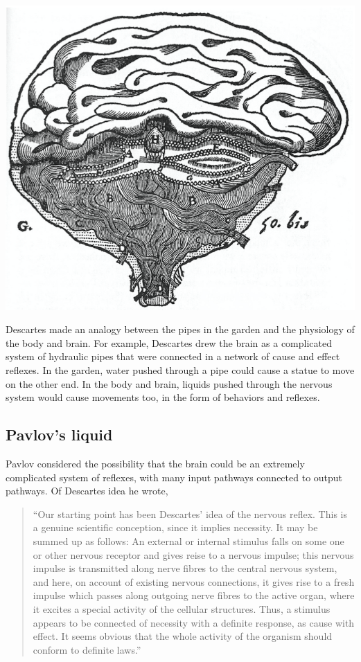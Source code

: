 \documentclass[
  oneside,
  12pt]{crumpbook}
\newenvironment{floatright50}{%
  \wrapfigure{R}{.5\textwidth}%
  }{%
  \endwrapfigure}
\begin{document}
\begin{floatright50}
\includegraphics[width=1\linewidth]{imgs/Descartes_brain_large}

\end{floatright50}

Descartes made an analogy between the pipes in the garden and the physiology of the body and brain. For example, Descartes drew the brain as a complicated system of hydraulic pipes that were connected in a network of cause and effect reflexes. In the garden, water pushed through a pipe could cause a statue to move on the other end. In the body and brain, liquids pushed through the nervous system would cause movements too, in the form of behaviors and reflexes.

\hypertarget{pavlovs-liquid}{%
\subsection{Pavlov's liquid}\label{pavlovs-liquid}}

Pavlov considered the possibility that the brain could be an extremely complicated system of reflexes, with many input pathways connected to output pathways. Of Descartes idea he wrote,

\begin{quote}
``Our starting point has been Descartes' idea of the nervous reflex. This is a genuine scientific conception, since it implies necessity. It may be summed up as follows: An external or internal stimulus falls on some one or other nervous receptor and gives reise to a nervous impulse; this nervous impulse is transmitted along nerve fibres to the central nervous system, and here, on account of existing nervous connections, it gives rise to a fresh impulse which passes along outgoing nerve fibres to the active organ, where it excites a special activity of the cellular structures. Thus, a stimulus appears to be connected of necessity with a definite response, as cause with effect. It seems obvious that the whole activity of the organism should conform to definite laws.''
\end{quote}
\end{document}
